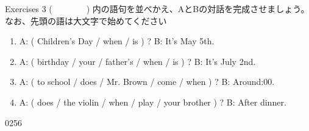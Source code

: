\documentclass[aspectratio=169,xcolor={dvipsnames,table}]{beamer}
\begin{document}
\begin{frame}[plain]{Exercises 3}
 (~~~~~~~~) 内の語句を並べかえ、AとBの対話を完成させましょう。なお、先頭の語は大文字で始めてください

\begin{enumerate}
 \item A: ( Children's Day / when / is ) ? 
\hspace{137.4pt}B: It's May 5th.\\
\phantom{A: }
 \item A: ( birthday / your / father's / when / is ) ?
\hspace{83.5pt}B: It's July 2nd.\\
\phantom{A: }
 \item A: ( to school / does / Mr. Brown / come / when ) ?
\hspace{47pt}B: Around:00.\\
\phantom{A: }
 \item A: ( does / the violin / when / play / your brother ) ?
\hspace{39.7pt}B: After dinner.\\
\phantom{A: }
\end{enumerate}

\mbox{}\hfill{\tiny 0256}\,{\scriptsize {}}

\end{frame}
\end{document}
